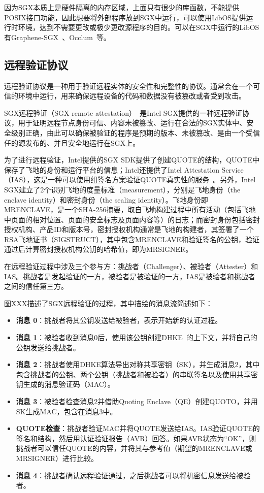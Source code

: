 因为SGX本质上是硬件隔离的内存区域，上面只有很少的库函数，不能提供POSIX接口功能，因此想要将外部程序放到SGX中运行，可以使用LibOS提供运行时环境，达到不需要更改或极少更改源程序的目的。可以在SGX中运行的LibOS有Graphene-SGX~\cite{}、Occlum~\cite{}等。
\subsection{远程验证协议}

远程验证协议是一种用于验证远程实体的安全性和完整性的协议。通常会在一个可信的环境中运行，用来确保远程设备的代码和数据没有被篡改或者受到攻击。

SGX远程验证（SGX remote attestation）~\cite{}是Intel SGX提供的一种远程验证协议，用于证明远程节点身份可信、内容未被篡改、运行在合法的SGX实体中、安全级别正确，由此可以确保被验证的程序是预期的版本、未被篡改、是由一个受信任的源发布的、并且安全地运行在SGX上。

为了进行远程验证，Intel提供的SGX SDK提供了创建QUOTE的结构，QUOTE中保存了飞地的身份和运行平台的信息；Intel还提供了Intel Attestation Service（IAS），这是一种可以使用组签名方案验证QUOTE真实性的服务~\cite{}。另外，Intel SGX建立了2个识别飞地的度量标准（measurement），分别是飞地身份（the enclave identity）和密封身份（the sealing identity）。飞地身份即MRENCLAVE，是一个SHA-256摘要，取自飞地构建过程中所有活动（包括飞地中页面的相对位置、页面的安全标志及页面内容等）的日志；而密封身份包括密封授权机构、产品ID和版本号，密封授权机构通常是飞地的构建者，其签署了一个RSA飞地证书（SIGSTRUCT），其中包含MRENCLAVE和验证签名的公钥，验证通过后计算密封授权机构公钥的哈希值，即为MRSIGNER。

在远程验证过程中涉及三个参与方：挑战者（Challenger）、被验者（Attester）和IAS。挑战者是发起验证的一方，被验者是被验证的一方，IAS是被验者和挑战者之间的信任第三方。


图XXX描述了SGX远程验证的过程，其中描绘的消息流简述如下：

\begin{itemize}
    \item \textbf{消息 0}：挑战者将其公钥发送给被验者，表示开始新的认证过程。
    \item \textbf{消息 1}：被验者收到消息0后，使用该公钥创建DHKE~\cite{}的上下文，并将自己的公钥发送给挑战者。%
    \item \textbf{消息 2}：挑战者使用DHKE算法导出对称共享密钥（SK），并生成消息2，其中包含挑战者的公钥、两个公钥（挑战者和被验者）的串联签名以及使用共享密钥生成的消息验证码（MAC）。
    \item \textbf{消息 3}：被验者检查消息2并借助Quoting Enclave（QE）创建QUOTO，并用SK生成MAC，包含在消息3中。
    \item \textbf{QUOTE检查}：挑战者验证MAC并将QUOTE发送给IAS。IAS验证QUOTE的签名和结构，然后用认证验证报告（AVR）回答。如果AVR状态为“OK”，则挑战者可以信任QUOTE的内容，并将其与参考值（期望的MRENCLAVE或MRSIGNER）进行比较。
    \item \textbf{消息 4}：挑战者确认远程验证通过，之后挑战者可以将机密信息发送给被验者。
\end{itemize}

